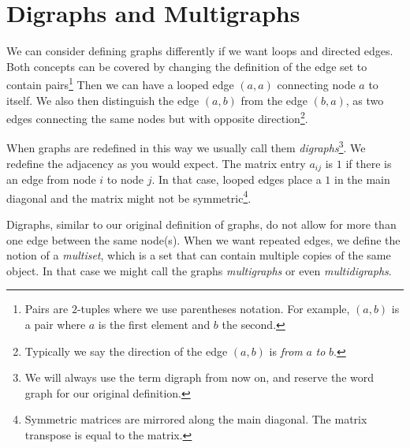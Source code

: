 \documentclass{iansnotes}
\begin{document}
\section{Digraphs and Multigraphs}
  We can consider defining graphs differently if we want loops and directed edges.
  Both concepts can be covered by changing the definition of the edge set to contain pairs\footnote{Pairs are $2$-tuples where we use parentheses notation. For example, $(a,b)$ is a pair where $a$ is the first element and $b$ the second.}
  Then we can have a looped edge $(a,a)$ connecting node $a$ to itself.
  We also then distinguish the edge $(a,b)$ from the edge $(b,a)$, as two edges connecting the same nodes but with opposite direction\footnote{Typically we say the direction of the edge $(a,b)$ is \emph{from} $a$ \emph{to} $b$.}.

  When graphs are redefined in this way we usually call them \emph{digraphs}\footnote{We will always use the term digraph from now on, and reserve the word graph for our original definition.}.
  We redefine the adjacency as you would expect.
  The matrix entry $a_{ij}$ is $1$ if there is an edge from node $i$ to node $j$.
  In that case, looped edges place a $1$ in the main diagonal and the matrix might not be symmetric\footnote{Symmetric matrices are mirrored along the main diagonal. The matrix transpose is equal to the matrix.}.

  Digraphs, similar to our original definition of graphs, do not allow for more than one edge between the same node(s).
  When we want repeated edges, we define the notion of a \emph{multiset}, which is a set that can contain multiple copies of the same object.
  In that case we might call the graphs \emph{multigraphs} or even \emph{multidigraphs}.
\end{document}

